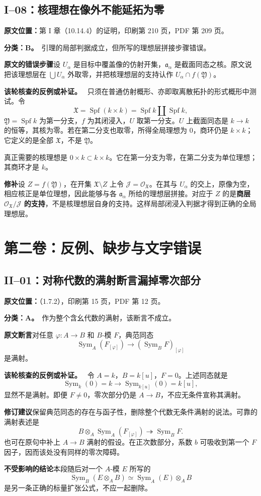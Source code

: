\documentclass[UTF8,a4paper]{ctexbook}
\newcommand{\OO}{\mathscr O}
\DeclareMathOperator{\Spf}{Spf}
\newcommand{\JJ}{\mathcal J}
\newcommand{\oldauditsrc}[1]{\par\noindent\textbf{原文位置：}#1。\par}
\newcommand{\kind}[2]{\noindent\textbf{分类：#1。}\ #2\par}
\newcommand{\lead}[1]{\par\noindent\textbf{#1}\quad}
\newenvironment{analysisproof}{\par\noindent\textbf{该轮核查的反例或补证。}\ }{\par}
\begin{document}
\section{I--08：核理想在像外不能延拓为零}
\oldauditsrc{第 I 章（10.14.4）的证明，印刷第 210 页，PDF 第 209 页}
\kind{B}{引理的局部判据成立，但所写的理想层拼接步骤错误。}
\lead{原文的错误步骤}设 $U_\alpha$ 是目标中覆盖像的仿射开集，$\mathfrak a_\alpha$ 是截面同态之核。原文说把该理想层在 $\bigcup U_\alpha$ 外取零，并把核理想层的支持认作 $U_\alpha\cap f(\mathfrak Y)$。
\begin{analysisproof}
只须在普通仿射概形、亦即取离散拓扑的形式概形中测试。令
\[
\mathfrak X=\Spf(k\times k)=\Spf k\amalg\Spf k,
\]
$\mathfrak Y=\Spf k$ 为第一分支，$f$ 为其闭浸入，$U$ 取第一分支。$U$ 上截面同态是 $k\to k$ 的恒等，其核为零。若在第二分支也取零，所得全局理想为 $0$，商环仍是 $k\times k$；它定义的是全部 $\mathfrak X$，不是 $\mathfrak Y$。

真正需要的核理想是 $0\times k\subset k\times k$。它在第一分支为零，在第二分支为单位理想；其商环才是 $k$。
\end{analysisproof}
\lead{修补}设 $Z=f(\mathfrak Y)$，在开集 $\mathfrak X\setminus Z$ 上令 $\JJ=\OO_{\mathfrak X}$。在其与 $U_\alpha$ 的交上，原像为空，相应核正是单位理想，因此能够与各 $\mathfrak a_\alpha$ 所给的理想层拼接。对应于 $Z$ 的是\textbf{商层 $\OO_{\mathfrak X}/\JJ$ 的支持}，不是核理想层自身的支持。这样局部闭浸入判据才得到正确的全局理想层。

\chapter{第二卷：反例、缺步与文字错误}
\section{II--01：对称代数的满射断言漏掉零次部分}
\oldauditsrc{（1.7.2），印刷第 15 页，PDF 第 12 页}
\kind{A}{作为整个含幺代数的满射，该断言不成立。}
\lead{原文断言}对任意 $\varphi:A\to B$ 和 $B$-模 $F$，典范同态
\[
\operatorname{Sym}_A(F_{[\varphi]})\longrightarrow(\operatorname{Sym}_BF)_{[\varphi]}
\]
是满射。
\begin{analysisproof}
令 $A=k$，$B=k[u]$，$F=0$。上述同态就是
\[
\operatorname{Sym}_k(0)=k\longrightarrow\operatorname{Sym}_{k[u]}(0)=k[u],
\]
显然不是满射。即便 $F\ne0$，零次部分仍是 $A\to B$，不应无条件宣称其满射。
\end{analysisproof}
\lead{修订建议}保留典范同态的存在与函子性，删除整个代数无条件满射的说法。可靠的满射表述是
\[
B\otimes_A\operatorname{Sym}_A(F_{[\varphi]})\twoheadrightarrow\operatorname{Sym}_BF.
\]
也可在原句中补上 $A\to B$ 满射的假设。在正次数部分，系数 $b$ 可吸收到第一个 $F$ 因子，因而该处没有同样的零次障碍。
\lead{不受影响的结论}本段随后对一个 $A$-模 $E$ 所写的
\[
\operatorname{Sym}_B(E\otimes_AB)\simeq\operatorname{Sym}_A(E)\otimes_AB
\]
是另一条正确的标量扩张公式，不应一起删除。
\end{document}
